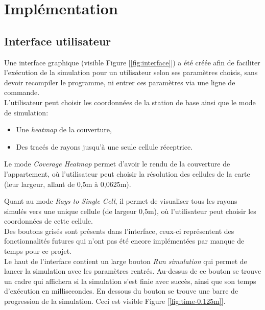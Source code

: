 \chapter{Implémentation}
\label{chaper-2}




\section{Interface utilisateur}
Une interface graphique (visible Figure [\ref{fig:interface}]) a été créée afin de faciliter l'exécution de la simulation pour un utilisateur selon ses paramètres choisis, sans devoir recompiler le programme, ni entrer ces paramètres via une ligne de commande.\\

L'utilisateur peut choisir les coordonnées de la station de base ainsi que le mode de simulation:
\begin{itemize}
    \item Une \textit{heatmap} de la couverture,
    \item Des tracés de rayons jusqu'à une seule cellule réceptrice.
\end{itemize}

Le mode \textit{Coverage Heatmap} permet d'avoir le rendu de la couverture de l'appartement, où l'utilisateur peut choisir la résolution des cellules de la carte (leur largeur, allant de 0,5m à 0,0625m).

Quant au mode \textit{Rays to Single Cell}, il permet de visualiser tous les rayons simulés vers une unique cellule (de largeur 0,5m), où l'utilisateur peut choisir les coordonnées de cette cellule.\\

Des boutons grisés sont présents dans l'interface, ceux-ci représentent des fonctionnalités futures qui n'ont pas été encore implémentées par manque de temps pour ce projet.\\

Le haut de l'interface contient un large bouton \textit{Run simulation} qui permet de lancer la simulation avec les paramètres rentrés. Au-dessus de ce bouton se trouve un cadre qui affichera si la simulation s'est finie avec succès, ainsi que son temps d'exécution en millisecondes. En dessous du bouton se trouve une barre de progression de la simulation. Ceci est visible Figure [\ref{fig:time-0.125m}].\\


